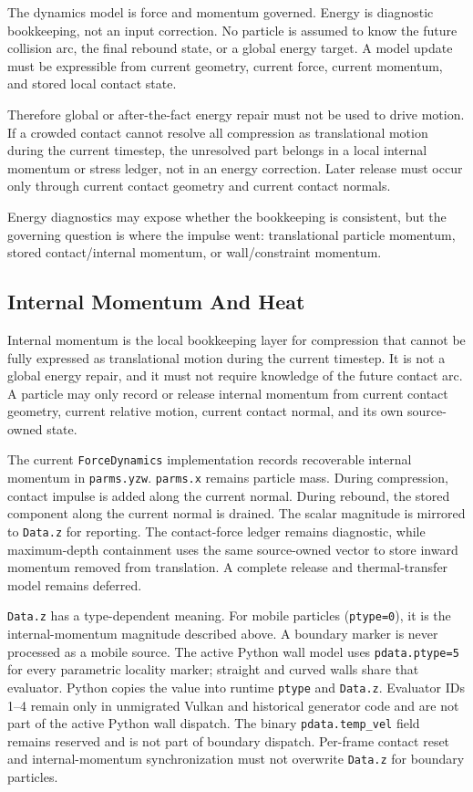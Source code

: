 The dynamics model is force and momentum governed.  Energy is diagnostic
bookkeeping, not an input correction.  No particle is assumed to know the
future collision arc, the final rebound state, or a global energy target.  A
model update must be expressible from current geometry, current force, current
momentum, and stored local contact state.

Therefore global or after-the-fact energy repair must not be used to drive
motion.  If a crowded contact cannot resolve all compression as translational
motion during the current timestep, the unresolved part belongs in a local
internal momentum or stress ledger, not in an energy correction.  Later release
must occur only through current contact geometry and current contact normals.

Energy diagnostics may expose whether the bookkeeping is consistent, but the
governing question is where the impulse went: translational particle momentum,
stored contact/internal momentum, or wall/constraint momentum.

\subsection{Internal Momentum And Heat}

Internal momentum is the local bookkeeping layer for compression that cannot be
fully expressed as translational motion during the current timestep.  It is not
a global energy repair, and it must not require knowledge of the future contact
arc.  A particle may only record or release internal momentum from current
contact geometry, current relative motion, current contact normal, and its own
source-owned state.

The current \texttt{ForceDynamics} implementation records recoverable internal
momentum in \texttt{parms.yzw}.  \texttt{parms.x} remains
particle mass.  During compression, contact impulse is added along the current
normal.  During rebound, the stored component along the current normal is
drained.  The scalar magnitude is mirrored to \texttt{Data.z} for reporting.
The contact-force ledger remains diagnostic, while maximum-depth containment
uses the same source-owned vector to store inward momentum removed from
translation.  A complete release and thermal-transfer model remains deferred.

\texttt{Data.z} has a type-dependent meaning.  For mobile particles
(\texttt{ptype=0}), it is the internal-momentum magnitude described above.  A
boundary marker is never processed as a mobile source.  The active Python
wall model uses \texttt{pdata.ptype=5} for every parametric locality marker;
straight and curved walls share that evaluator.  Python copies the value into
runtime \texttt{ptype} and \texttt{Data.z}.  Evaluator IDs 1--4 remain only
in unmigrated Vulkan and historical generator code and are not part of the
active Python wall dispatch.  The binary
\texttt{pdata.temp\_vel} field remains reserved and is not part of boundary
dispatch.  Per-frame contact reset and internal-momentum synchronization must
not overwrite \texttt{Data.z} for boundary particles.

